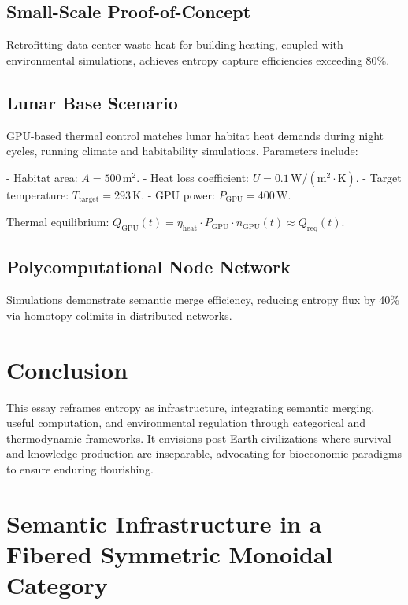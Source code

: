 \documentclass[12pt]{article}
\begin{document}
\subsection{Small-Scale Proof-of-Concept}

Retrofitting data center waste heat for building heating, coupled with environmental simulations, achieves entropy capture efficiencies exceeding 80\%.

\subsection{Lunar Base Scenario}

GPU-based thermal control matches lunar habitat heat demands during night cycles, running climate and habitability simulations. Parameters include:

- Habitat area: $ A = 500 \, \text{m}^2 $.
- Heat loss coefficient: $ U = 0.1 \, \text{W}/(\text{m}^2 \cdot \text{K}) $.
- Target temperature: $ T_{\text{target}} = 293 \, \text{K} $.
- GPU power: $ P_{\text{GPU}} = 400 \, \text{W} $.

Thermal equilibrium: $ Q_{\text{GPU}}(t) = \eta_{\text{heat}} \cdot P_{\text{GPU}} \cdot n_{\text{GPU}}(t) \approx Q_{\text{req}}(t) $.

\subsection{Polycomputational Node Network}

Simulations demonstrate semantic merge efficiency, reducing entropy flux by 40\% via homotopy colimits in distributed networks.

\section{Conclusion}
\label{sec:conclusion}

This essay reframes entropy as infrastructure, integrating semantic merging, useful computation, and environmental regulation through categorical and thermodynamic frameworks. It envisions post-Earth civilizations where survival and knowledge production are inseparable, advocating for bioeconomic paradigms to ensure enduring flourishing.

\appendix

\section{Semantic Infrastructure in a Fibered Symmetric Monoidal Category}
\label{app:semantic-infra}
\end{document}
